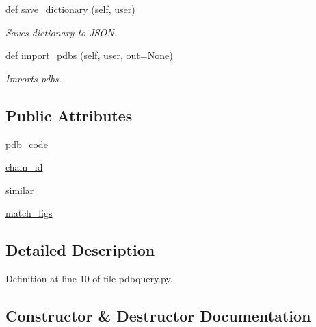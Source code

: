 \begin{DoxyCompactItemize}
def \hyperlink{classfragalysis__api_1_1xcimporter_1_1pdbquery_1_1_query_a42babe6a340aaf0b2dcc84ea5d0c0b11}{save\+\_\+dictionary} (self, user)
\begin{DoxyCompactList}\small\item\em Saves dictionary to J\+S\+ON. \end{DoxyCompactList}\item 
def \hyperlink{classfragalysis__api_1_1xcimporter_1_1pdbquery_1_1_query_a5be8d71963fc482622a0b1167636718c}{import\+\_\+pdbs} (self, user, \hyperlink{namespacefragalysis__api_1_1xcimporter_1_1pdbquery_a7e1833466eb7f1ed11f7bf148033aa2b}{out}=None)
\begin{DoxyCompactList}\small\item\em Imports pdbs. \end{DoxyCompactList}\end{DoxyCompactItemize}
\subsection*{Public Attributes}
\begin{DoxyCompactItemize}
\item 
\hyperlink{classfragalysis__api_1_1xcimporter_1_1pdbquery_1_1_query_aa773c64b22dedb31eb01f3286a2e1a53}{pdb\+\_\+code}
\item 
\hyperlink{classfragalysis__api_1_1xcimporter_1_1pdbquery_1_1_query_a79cbf79b07436d26929d7576a5f687da}{chain\+\_\+id}
\item 
\hyperlink{classfragalysis__api_1_1xcimporter_1_1pdbquery_1_1_query_a14c73f40bf22f1b1e4388b9215307ee2}{similar}
\item 
\hyperlink{classfragalysis__api_1_1xcimporter_1_1pdbquery_1_1_query_a5162fe822deae38446960b3593b17aa5}{match\+\_\+ligs}
\end{DoxyCompactItemize}


\subsection{Detailed Description}


Definition at line 10 of file pdbquery.\+py.



\subsection{Constructor \& Destructor Documentation}
\mbox{\label{classfragalysis__api_1_1xcimporter_1_1pdbquery_1_1_query_a4c9143433e01d6c355246e1ea4f86265}} 
